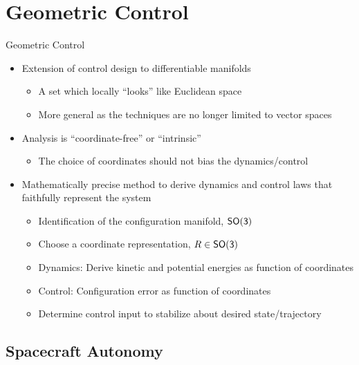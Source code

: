 
\section{Geometric Control}

\begin{frame}{Geometric Control}
    \begin{itemize}
        \item Extension of control design to differentiable manifolds
            \begin{itemize}
                \item A set which locally ``looks'' like Euclidean space
                \item More general as the techniques are no longer limited to vector spaces
            \end{itemize}
        \item Analysis is ``coordinate-free'' or ``intrinsic''
            \begin{itemize}
                \item The choice of coordinates should not bias the dynamics/control 
            \end{itemize}
        \item Mathematically precise method to derive dynamics and control laws that faithfully represent the system
            \begin{itemize}
                \item Identification of the configuration manifold, \( \mathsf{SO(3)} \)
                \item Choose a coordinate representation, \( R \in \mathsf{SO(3)} \)
                \item Dynamics: Derive kinetic and potential energies as function of coordinates
                \item Control: Configuration error as function of coordinates
                \item Determine control input to stabilize about desired state/trajectory
            \end{itemize}
    \end{itemize}
\end{frame}
\subsection[Spacecraft Autonomy]{Spacecraft Autonomy}

